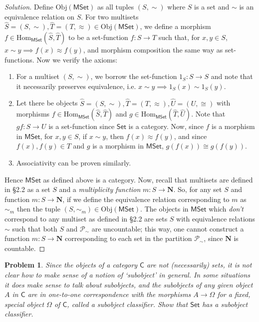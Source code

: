 \documentclass[fontsize=14pt]{scrartcl}
\newtheorem{problem-internal}{Problem}[subsection]
\newenvironment{problem}{
  \medskip
  \begin{problem-internal}
}{
  \end{problem-internal}
}
\newenvironment{solution}{
  \begin{proof}[Solution]
  \vspace{-8px}
  \setlength{\parskip}{4px}
  \setlength{\parindent}{0px}
}{
  \end{proof}
}
\newcommand{\Obj}{\mathrm{Obj}}
\newcommand{\Hom}{\mathrm{Hom}}
\begin{document}
\begin{solution}
\def \Set {\mathsf{Set}}
\def \MSet {\mathsf{MSet}}

Define $\Obj(\MSet)$ as all tuples $(S, \sim)$ where $S$ is a set and $\sim$ is
an equivalence relation on $S$. For two multisets $\hat{S} = (S,\sim), \hat{T} =
(T,\approx) \in \Obj(\MSet)$, we define a morphism
$f\in\Hom_\MSet(\hat{S},\hat{T})$ to be a set-function $f:S\to T$ such that, for
$x,y\in S$, $x\sim y\implies f(x)\approx f(y)$, and morphism composition the
same way as set-functions. Now we verify the axioms:

\begin{enumerate}
\item For a multiset $(S,\sim)$, we borrow the set-function $1_S:S\to S$ and
note that it necessarily preserves equivalence, i.e. $x\sim y\implies 1_S(x)\sim
1_S(y)$.
\item Let there be objects $\hat{S}=(S,\sim), \hat{T}=(T,\approx),
\hat{U}=(U,\cong)$ with morphisms $f\in\Hom_\MSet(\hat{S},\hat{T})$ and
$g\in\Hom_\MSet(\hat{T},\hat{U})$. Note that $gf:S\to U$ is a set-function since
$\Set$ is a category. Now, since $f$ is a morphism in $\MSet$, for
$x,y\in S$, if $x\sim y$, then $f(x)\approx f(y)$, and since $f(x),f(y)\in T$
and $g$ is a morphism in $\MSet$, $g(f(x))\cong g(f(y))$.
\item Associativity can be proven similarly.
\end{enumerate}

Hence $\MSet$ as defined above is a category. Now, recall that multisets are
defined in \S2.2 as a set $S$ and a \textit{multiplicity function}
$m:S\to\mathbf{N}$. So, for any set $S$ and function $m:S\to\mathbf{N}$, if we
define the equivalence relation corresponding to $m$ as $\sim_m$ then the
tuple $(S,\sim_m)\in\Obj(\MSet)$. The objects in $\MSet$ which
\textit{don't} correspond to any multiset as defined in \S2.2 are sets $S$ with
equivalence relations $\sim$ such that both $S$ and $\mathscr{P}_\sim$ are
uncountable; this way, one cannot construct a function $m:S\to\mathbf{N}$
corresponding to each set in the partition $\mathscr{P}_\sim$, since
$\mathbf{N}$ is countable.
\end{solution}


\begin{problem}
\def \C {\mathsf{C}}
\def \Set {\mathsf{Set}}

Since the objects of a category $\C$ are not (necessarily) sets, it is not clear
how to make sense of a notion of `subobject' in general. In some situations it
\textit{does} make sense to talk about subobjects, and the subobjects of any
given object $A$ in $\C$ are in one-to-one correspondence with the morphisms
$A\to\Omega$ for a fixed, special object $\Omega$ of $\C$, called a
\textit{subobject classifier}. Show that $\Set$ has a subobject classifier.
\end{problem}
\end{document}
